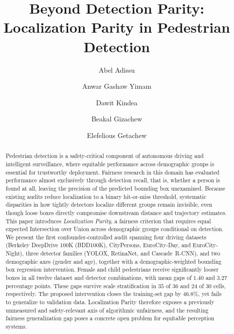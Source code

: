 \documentclass[runningheads]{llncs}
\begin{document}
\raggedbottom

\title{Beyond Detection Parity: Localization Parity in Pedestrian Detection}

\author{Abel Adissu \and
Anwar Gashaw Yimam \and
Dawit Kindea \and
Beakal Gizachew \and
Elefelious Getachew}

\maketitle

\begin{abstract}
Pedestrian detection is a safety-critical component of autonomous driving and
intelligent surveillance, where equitable performance across demographic groups
is essential for trustworthy deployment. Fairness research in this domain has
evaluated performance almost exclusively through detection recall, that is,
whether a person is found at all, leaving the precision of the predicted
bounding box unexamined. Because existing audits reduce localization to a binary
hit-or-miss threshold, systematic disparities in how tightly detectors localize
different groups remain invisible, even though loose boxes directly compromise
downstream distance and trajectory estimates. This paper introduces
\emph{Localization Parity}, a fairness criterion that requires equal expected
Intersection over Union across demographic groups conditional on detection. We
present the first confounder-controlled audit spanning four driving datasets
(Berkeley DeepDrive 100K (BDD100K), CityPersons, EuroCity-Day, and
EuroCity-Night), three detector families (YOLOX, RetinaNet, and
Cascade~R-CNN), and two demographic axes
(gender and age), together with a demographic-weighted bounding box regression
intervention. Female and child pedestrians receive significantly looser boxes in
all twelve dataset and detector combinations, with mean gaps of $1.40$ and
$3.27$ percentage points. These gaps survive scale stratification in $35$ of
$36$ and $24$ of $30$ cells, respectively. The proposed intervention closes the
training-set gap by $46.8\%$, yet fails to generalize to validation data.
Localization Parity therefore exposes a previously unmeasured and
safety-relevant axis of algorithmic unfairness, and the resulting fairness
generalization gap poses a concrete open problem for equitable perception
systems.
\end{abstract}
\end{document}
